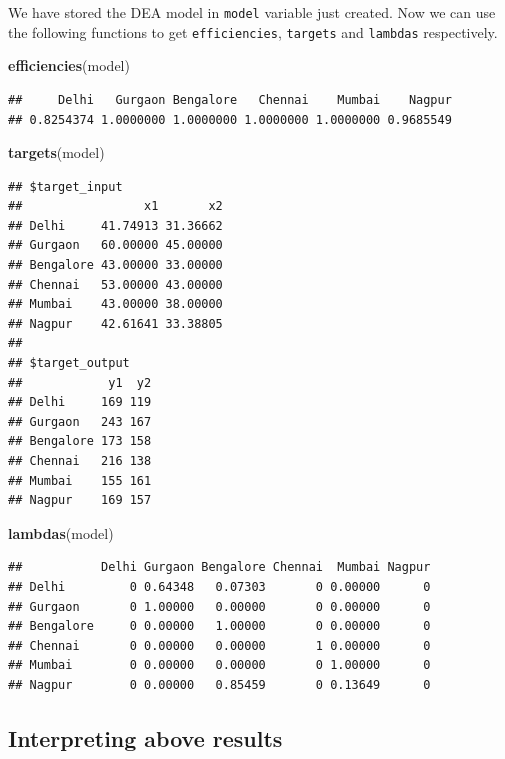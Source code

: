 \documentclass[
]{book}
\newenvironment{Shaded}{\begin{snugshade}}{\end{snugshade}}
\newcommand{\FunctionTok}[1]{\textcolor[rgb]{0.13,0.29,0.53}{\textbf{#1}}}
\newcommand{\NormalTok}[1]{#1}
\begin{document}
We have stored the DEA model in \texttt{model} variable just created. Now we can use the following functions to get \texttt{efficiencies}, \texttt{targets} and \texttt{lambdas} respectively.

\begin{Shaded}
\begin{Highlighting}[]
\FunctionTok{efficiencies}\NormalTok{(model)}
\end{Highlighting}
\end{Shaded}

\begin{verbatim}
##     Delhi   Gurgaon Bengalore   Chennai    Mumbai    Nagpur 
## 0.8254374 1.0000000 1.0000000 1.0000000 1.0000000 0.9685549
\end{verbatim}

\begin{Shaded}
\begin{Highlighting}[]
\FunctionTok{targets}\NormalTok{(model)}
\end{Highlighting}
\end{Shaded}

\begin{verbatim}
## $target_input
##                 x1       x2
## Delhi     41.74913 31.36662
## Gurgaon   60.00000 45.00000
## Bengalore 43.00000 33.00000
## Chennai   53.00000 43.00000
## Mumbai    43.00000 38.00000
## Nagpur    42.61641 33.38805
## 
## $target_output
##            y1  y2
## Delhi     169 119
## Gurgaon   243 167
## Bengalore 173 158
## Chennai   216 138
## Mumbai    155 161
## Nagpur    169 157
\end{verbatim}

\begin{Shaded}
\begin{Highlighting}[]
\FunctionTok{lambdas}\NormalTok{(model)}
\end{Highlighting}
\end{Shaded}

\begin{verbatim}
##           Delhi Gurgaon Bengalore Chennai  Mumbai Nagpur
## Delhi         0 0.64348   0.07303       0 0.00000      0
## Gurgaon       0 1.00000   0.00000       0 0.00000      0
## Bengalore     0 0.00000   1.00000       0 0.00000      0
## Chennai       0 0.00000   0.00000       1 0.00000      0
## Mumbai        0 0.00000   0.00000       0 1.00000      0
## Nagpur        0 0.00000   0.85459       0 0.13649      0
\end{verbatim}

\hypertarget{interpreting-above-results}{%
\subsection{Interpreting above results}\label{interpreting-above-results}}
\end{document}
